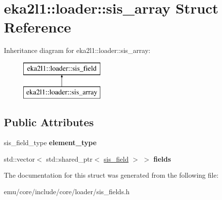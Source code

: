 \hypertarget{structeka2l1_1_1loader_1_1sis__array}{}\section{eka2l1\+:\+:loader\+:\+:sis\+\_\+array Struct Reference}
\label{structeka2l1_1_1loader_1_1sis__array}
Inheritance diagram for eka2l1\+:\+:loader\+:\+:sis\+\_\+array\+:\begin{figure}[H]
\begin{center}
\leavevmode
\includegraphics[height=2.000000cm]{structeka2l1_1_1loader_1_1sis__array}
\end{center}
\end{figure}
\subsection*{Public Attributes}
\begin{DoxyCompactItemize}
\item 
\mbox{\label{structeka2l1_1_1loader_1_1sis__array_a4e5992e252b8de68ac69886fae986d6e}} 
sis\+\_\+field\+\_\+type {\bfseries element\+\_\+type}
\item 
\mbox{\label{structeka2l1_1_1loader_1_1sis__array_aea4b54dccd4e735e93438fb42175259b}} 
std\+::vector$<$ std\+::shared\+\_\+ptr$<$ \mbox{\hyperlink{structeka2l1_1_1loader_1_1sis__field}{sis\+\_\+field}} $>$ $>$ {\bfseries fields}
\end{DoxyCompactItemize}


The documentation for this struct was generated from the following file\+:\begin{DoxyCompactItemize}
\item 
emu/core/include/core/loader/sis\+\_\+fields.\+h\end{DoxyCompactItemize}

